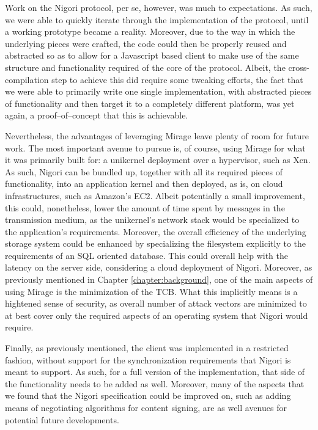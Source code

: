 Work on the Nigori protocol, per se, however, was much to expectations.
As such, we were able to quickly iterate through the implementation of the protocol, until a working prototype became a reality.
Moreover, due to the way in which the underlying pieces were crafted, the code could then be properly reused and abstracted so as to allow for a Javascript based client to make use of the same structure and functionality required of the core of the protocol.
Albeit, the cross-compilation step to achieve this did require some tweaking efforts, the fact that we were able to primarily write one single implementation, with abstracted pieces of functionality and then target it to a completely different platform, was yet again, a proof--of--concept that this is achievable.

Nevertheless, the advantages of leveraging Mirage leave plenty of room for future work.
The most important avenue to pursue is, of course, using Mirage for what it was primarily built for: a unikernel deployment over a hypervisor, such as Xen.
As such, Nigori can be bundled up, together with all its required pieces of functionality, into an application kernel and then deployed, as is, on cloud infrastructures, such as Amazon's EC2.
Albeit potentially a small improvement, this could, nonetheless, lower the amount of time spent by messages in the transmission medium, as the unikernel's network stack would be specialized to the application's requirements.
Moreover, the overall efficiency of the underlying storage system could be enhanced by specializing the filesystem explicitly to the requirements of an SQL oriented database.
This could overall help with the latency on the server side, considering a cloud deployment of Nigori.
Moreover, as previously mentioned in Chapter \ref{chapter:background}, one of the main aspects of using Mirage is the minimization of the TCB.
What this implicitly means is a hightened sense of security, as overall number of attack vectors are minimized to at best cover only the required aspects of an operating system that Nigori would require.

Finally, as previously mentioned, the client was implemented in a restricted fashion, without support for the synchronization requirements that Nigori is meant to support.
As such, for a full version of the implementation, that side of the functionality needs to be added as well.
Moreover, many of the aspects that we found that the Nigori specification could be improved on, such as adding means of negotiating algorithms for content signing, are as well avenues for potential future developments.

